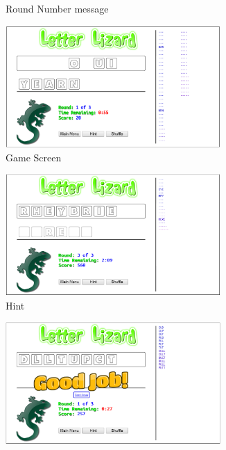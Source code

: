 \begin{figure}
\begin{subfigure}{0.49\textwidth}
        \caption{Round Number message}
        \label{lljsround}
    \end{subfigure}
    \begin{subfigure}{0.49\textwidth}
        \includegraphics[width=0.9\textwidth]{../screenshots/LetterLizardJS-Gameplay2.png}
        \caption{Game Screen}
        \label{lljsgame}
    \end{subfigure}    
    \begin{subfigure}{0.49\textwidth}
        \includegraphics[width=0.9\textwidth]{../screenshots/LetterLizardJS-Hint2.png}
        \caption{Hint}
        \label{lljshint}
    \end{subfigure}
    \begin{subfigure}{0.49\textwidth}
        \includegraphics[width=0.9\textwidth]{../screenshots/LetterLizardJS-GoodJob3.png}

\end{subfigure}
\end{figure}
